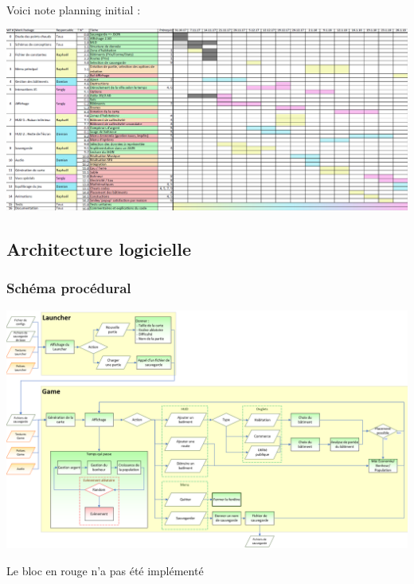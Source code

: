 \documentclass[a4paper,10pt,openany,oneside]{report}
\begin{document}
\paragraph{}
Voici note planning initial :
\begin{center}
\includegraphics[width=1.1\textwidth]{img/planning_initial.png}
\end{center}
\subsection{Architecture logicielle}
\subsubsection{Schéma procédural}
\begin{center}
\includegraphics[width=\textwidth]{img/schema_proc.png}
\end{center}
Le bloc en rouge n'a pas été implémenté
\end{document}
